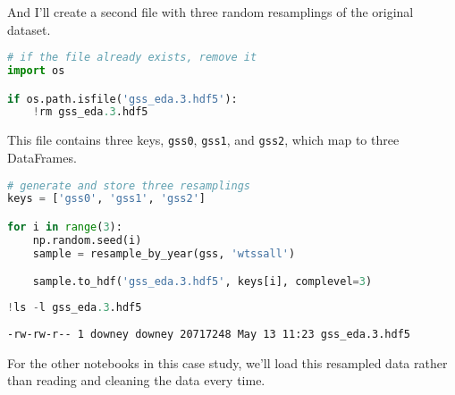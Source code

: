 And I'll create a second file with three random resamplings of the
original dataset.

\begin{lstlisting}[language=Python,style=source]
# if the file already exists, remove it
import os

if os.path.isfile('gss_eda.3.hdf5'):
    !rm gss_eda.3.hdf5
\end{lstlisting}

This file contains three keys, \passthrough{\lstinline!gss0!},
\passthrough{\lstinline!gss1!}, and \passthrough{\lstinline!gss2!},
which map to three DataFrames.

\begin{lstlisting}[language=Python,style=source]
# generate and store three resamplings
keys = ['gss0', 'gss1', 'gss2']

for i in range(3):
    np.random.seed(i)
    sample = resample_by_year(gss, 'wtssall')

    sample.to_hdf('gss_eda.3.hdf5', keys[i], complevel=3)
\end{lstlisting}

\begin{lstlisting}[language=Python,style=source]
!ls -l gss_eda.3.hdf5
\end{lstlisting}

\begin{lstlisting}[style=output]
-rw-rw-r-- 1 downey downey 20717248 May 13 11:23 gss_eda.3.hdf5
\end{lstlisting}

For the other notebooks in this case study, we'll load this resampled
data rather than reading and cleaning the data every time.

